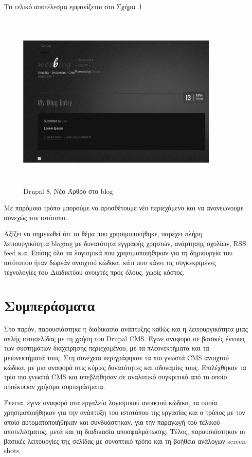 \documentclass[12pt]{report}
\begin{document}
Το τελικό αποτέλεσμα εμφανίζεται στο Σχήμα~\ref{fig:drupal_blog_entry}
\begin{figure}[H]
\centering
\includegraphics[width=0.9\textwidth, height=9cm]{drupal-blog-entry-gray}
\caption{\textlatin{Drupal 8}, Νέο Άρθρο στο \textlatin{blog}}
\label{fig:drupal_blog_entry}
\end{figure}

Με παρόμοιο τρόπο μπορούμε να προσθέτουμε νέο περιεχόμενο και να ανανεώνουμε συνεχώς τον ιστότοπο.

Αξίζει να σημειωθεί ότι το θέμα που χρησιμοποιήθηκε, παρέχει πλήρη λειτουργικότητα \textlatin{bloging} με δυνατότητα εγγραφής χρηστών, ανάρτησης σχολίων, \textlatin{RSS feed} κ.α. Επίσης όλα τα λογισμικά που χρησιμοποιήθηκαν για τη δημιουργία του ιστότοπου ήταν δωρεάν ανοιχτού κώδικα, κάτι που κάνει τις συγκεκριμένες τεχνολογίες του Διαδικτύου ανοιχτές προς όλους, χωρίς κόστος.

\section{Συμπεράσματα}
Στο παρόν, παρουσιάστηκε η διαδικασία ανάπτυξης καθώς και η λειτουργικότητα μιας απλής ιστοσελίδας με τη χρήση του \textlatin{Drupal CMS}. Έγινε αναφορά σε βασικές έννοιες των συστημάτων διαχείρησης περιεχομένου, με τα πλεονεκτήματα και τα μειονεκτήματά τους. Στη συνέχεια περιγράφηκαν τα πιο γνωστά \textlatin{CMS} ανοιχτού κώδικα, με μια αναφορά στις κύριες δυνατότητες και αδυναμίες τους. Επιλέχθηκαν τα τρία πιο γνωστά \textlatin{CMS} και υπεβλήθησαν σε αναλυτικό συγκριτικό από το οποίο προέκυψαν χρήσιμα συμπεράσματα.

Έπειτα, έγινε αναφορά στα εργαλεία λογισμικού ανοικτού κώδικα, τα οποία χρησιμοποιήθηκαν για την ανάπτυξη του ιστοτόπου της εργασίας και ο τρόπος με τον οποίο αυτοματοποιήθηκαν και συνδυάστηκαν, για την παραγωγή του τελικού αποτελέσματος, μετά και τη διαδικασία αποσφαλμάτωσης. Τέλος, παρουσιάστηκαν οι βασικές λειτουργίες της σελίδας με συνοπτικό τρόπο και τη βοήθεια ανάλογων \textlatin{screenshots}.
\end{document}

